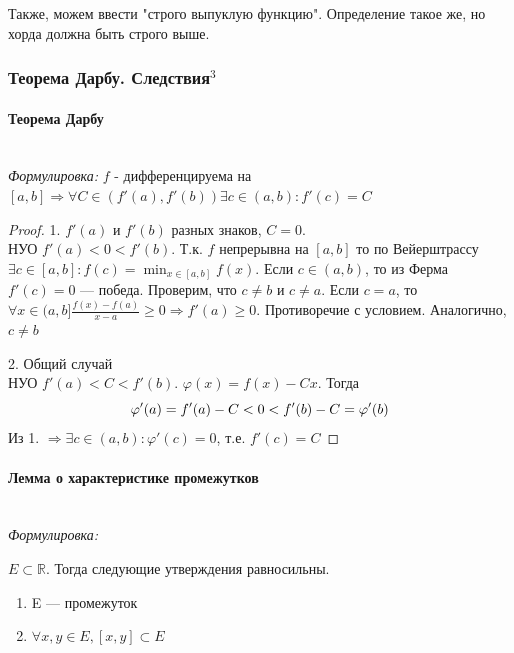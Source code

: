 \documentclass{article}
\let\vanillaparagraph\paragraph
\renewcommand{\paragraph}[1]{\vanillaparagraph{#1}\mbox{}\\}
\begin{document}
Также, можем ввести "строго выпуклую функцию". Определение такое же, но хорда должна быть строго выше.

\subsubsection{Теорема Дарбу. Следствия\texorpdfstring{$^3$}{}}

\paragraph{Теорема Дарбу}

\textit{Формулировка: }
    $f$ -  дифференцируема на $[a, b] \Rightarrow \forall C \in (f'(a), f'(b)) \exists c \in (a, b): f'(c) = C$

    \begin{proof}
    \item{1. $f'(a)$ и $f'(b)$ разных знаков, $C = 0$.\\}
    НУО $f'(a) < 0 < f'(b)$. Т.к. $f$ непрерывна на $[a, b]$ то по Вейерштрассу $\exists c \in [a, b]: f(c) = \min_{x\in [a,b]} f(x)$. Если $c\in (a, b)$, то из Ферма $f'(c) = 0$ --- победа. Проверим, что $c \neq b$ и $c \neq a$. Если $c = a$, то $\forall x \in (a, b] \frac{f(x) - f(a)}{x - a} \geq 0 \Rightarrow f'(a) \geq 0$. Противоречие с условием. Аналогично, $c \neq b$
    \item{2. Общий случай\\}
    НУО  $f'(a) < C < f'(b)$. $\varphi(x) = f(x) - Cx$. Тогда 
    \begin{equation}
    \varphi'(a) = f'(a) - C < 0 < f'(b) - C = \varphi'(b) \notag
    \end{equation}
    Из 1. $\Rightarrow \exists c \in (a, b): \varphi'(c) = 0$, т.е. $f'(c) = C$ 
    \end{proof}

\paragraph{Лемма о характеристике промежутков}

\textit{Формулировка: }

    $E \subset \mathbb{R}$. Тогда следующие утверждения равносильны.

    \begin{enumerate}
        \item E --- промежуток
        \item $\forall x,y \in E, [x, y] \subset E$
    \end{enumerate}
\end{document}
